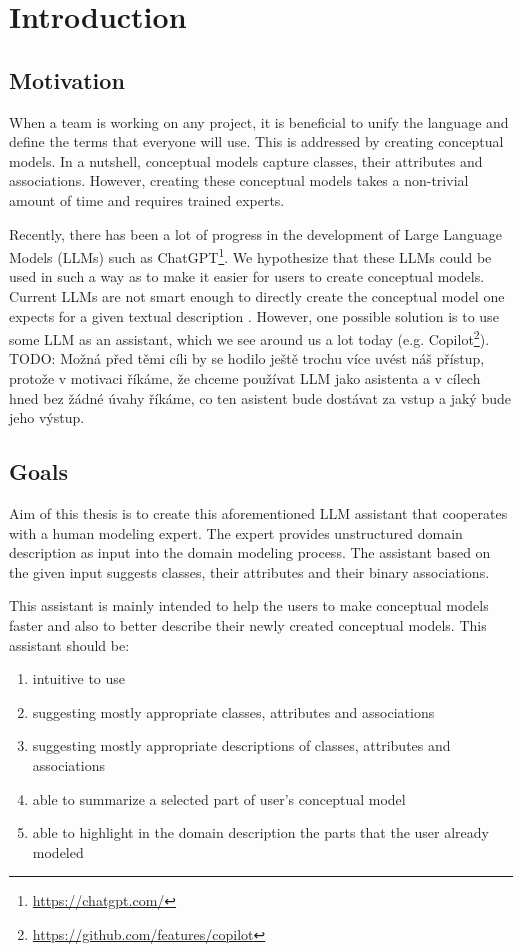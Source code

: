 \chapter*{Introduction}


\section*{Motivation}
When a team is working on any project, it is beneficial to unify the language and define the terms that everyone will use. This is addressed by creating conceptual models. In a nutshell, conceptual models capture classes, their attributes and associations. However, creating these conceptual models takes a non-trivial amount of time and requires trained experts.

Recently, there has been a lot of progress in the development of Large Language Models (LLMs) \cite{Zhao2023} such as ChatGPT\footnote{\url{https://chatgpt.com/}}. We hypothesize that these LLMs could be used in such a way as to make it easier for users to create conceptual models. Current LLMs are not smart enough to directly create the conceptual model one expects for a given textual description \cite{Chen2023}. However, one possible solution is to use some LLM as an assistant, which we see around us a lot today (e.g. Copilot\footnote{\url{https://github.com/features/copilot}}). \\


TODO: Možná před těmi cíli by se hodilo ještě trochu více uvést náš přístup, protože v motivaci říkáme, že chceme používat LLM jako asistenta a v cílech hned bez žádné úvahy říkáme, co ten asistent bude dostávat za vstup a jaký bude jeho výstup. \\



\section*{Goals}
Aim of this thesis is to create this aforementioned LLM assistant that cooperates with a human modeling expert. The expert provides unstructured domain description as input into the domain modeling process. The assistant based on the given input suggests classes, their attributes and their binary associations.

This assistant is mainly intended to help the users to make conceptual models faster and also to better describe their newly created conceptual models. This assistant should be:
\begin{enumerate}
\item intuitive to use
\item suggesting mostly appropriate classes, attributes and associations
\item suggesting mostly appropriate descriptions of classes, attributes and associations
\item able to summarize a selected part of user's conceptual model
\item able to highlight in the domain description the parts that the user already modeled
\end{enumerate}



